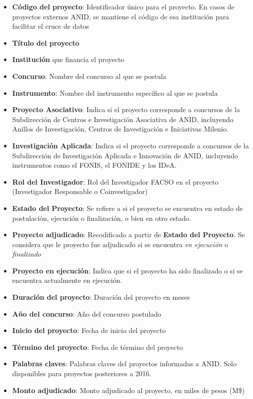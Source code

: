 \documentclass[
  spanish,
  letterpaper,
  DIV=11,
  numbers=noendperiod]{scrreprt}
\begin{document}
\begin{itemize}
\item
  \textbf{Código del proyecto}: Identificador único para el proyecto. En
  casos de proyectos externos ANID, se mantiene el código de esa
  institución para facilitar el cruce de datos
\item
  \textbf{Título del proyecto}
\item
  \textbf{Institución} que financia el proyecto
\item
  \textbf{Concurso}: Nombre del concurso al que se postula
\item
  \textbf{Instrumento}: Nombre del instrumento específico al que se
  postula
\item
  \textbf{Proyecto Asociativo}: Indica si el proyecto corresponde a
  concursos de la Subdirección de Centros e Investigación Asociativa de
  ANID, incluyendo Anillos de Investigación, Centros de Investigación e
  Iniciativas Milenio.
\item
  \textbf{Investigación Aplicada}: Indica si el proyecto corresponde a
  concursos de la Subdirección de Investigación Aplicada e Innovación de
  ANID, incluyendo instrumentos como el FONIS, el FONIDE y los IDeA.
\item
  \textbf{Rol del Investigador}: Rol del Investigador FACSO en el
  proyecto (Investigador Responsable o Coinvestigador)
\item
  \textbf{Estado del Proyecto}: Se refiere a si el proyecto se encuentra
  en estado de postulación, ejecución o finalización, o bien en otro
  estado.
\item
  \textbf{Proyecto adjudicado}: Recodificado a partir de \textbf{Estado
  del Proyecto}. Se considera que le proyecto fue adjudicado si se
  encuentra \emph{en ejecución} o \emph{finalizado}
\item
  \textbf{Proyecto en ejecución}: Indica que si el proyecto ha sido
  finalizado o si se encuentra actualmente en ejecución.
\item
  \textbf{Duración del proyecto}: Duración del proyecto en meses
\item
  \textbf{Año del concurso}: Año del concurso postulado
\item
  \textbf{Inicio del proyecto}: Fecha de inicio del proyecto
\item
  \textbf{Término del proyecto}: Fecha de término del proyecto
\item
  \textbf{Palabras claves}: Palabras claves del proyectos informadas a
  ANID. Solo disponibles para proyectos posteriores a 2016.
\item
  \textbf{Monto adjudicado}: Monto adjudicado al proyecto, en miles de
  pesos (M\$)
\end{itemize}
\end{document}
